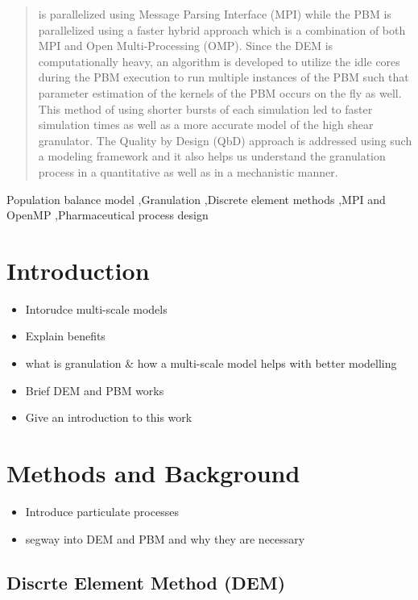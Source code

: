 \documentclass[preprint,11pt,authoryear]{elsarticle}
\begin{document}
\begin{frontmatter}
\begin{abstract}
is parallelized using Message Parsing Interface (MPI) while the PBM is parallelized using a faster
hybrid approach which is a combination of both MPI and Open Multi-Processing (OMP). Since
the DEM is computationally heavy, an algorithm is developed to utilize the idle cores during the
PBM execution to run multiple instances of the PBM such that parameter estimation of the kernels
of the PBM occurs on the fly as well. This method of using shorter bursts of each simulation led to
faster simulation times as well as a more accurate model of the high shear granulator. The Quality
by Design (QbD) approach is addressed using such a modeling framework and it also helps us
understand the granulation process in a quantitative as well as in a mechanistic manner. \citep{barrasso2015cerd}
\end{abstract}
\begin{keyword}
Population balance model \sep Granulation \sep Discrete element methods  \sep MPI and OpenMP 
\sep Pharmaceutical process design
\end{keyword}
\end{frontmatter}
\section{Introduction}
\begin{itemize}
\item{Intorudce multi-scale models}
\item{Explain benefits}
\item{what is granulation \& how a multi-scale model helps with better modelling}
\item{Brief DEM and PBM works}
\item{Give an introduction to this work}
\end{itemize}

\section{Methods and Background}
\begin{itemize}
\item{Introduce particulate processes}
\item{segway into DEM and PBM and why they are necessary}
\end{itemize}

\subsection{Discrte Element Method (DEM)}
\end{document}
